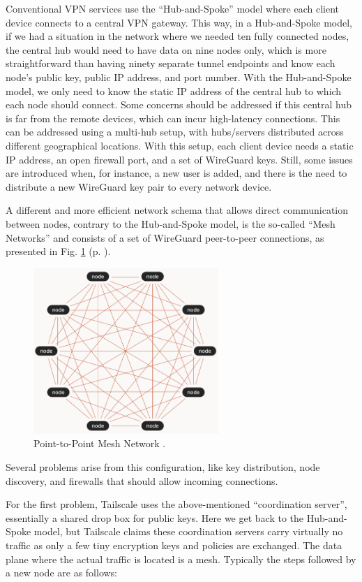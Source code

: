 Conventional VPN services use the ``Hub-and-Spoke'' model where each client device connects to a central VPN gateway. This way, in a Hub-and-Spoke model, if we had a situation in the network where we needed ten fully connected nodes, the central hub would need to have data on nine nodes only, which is more straightforward than having ninety separate tunnel endpoints and know each node's public key, public IP address, and port number. With the Hub-and-Spoke model, we only need to know the static IP address of the central hub to which each node should connect. Some concerns should be addressed if this central hub is far from the remote devices, which can incur high-latency connections. This can be addressed using a multi-hub setup, with hubs/servers distributed across different geographical locations. With this setup, each client device needs a static IP address, an open firewall port, and a set of WireGuard keys. Still, some issues are introduced when, for instance, a new user is added, and there is the need to distribute a new WireGuard key pair to every network device.

A different and more efficient network schema that allows direct communication between nodes, contrary to the Hub-and-Spoke model, is the so-called ``Mesh Networks'' and consists of a set of WireGuard peer-to-peer connections, as presented in Fig. \ref{fig:tailscale_mesh} (p. \pageref{fig:tailscale_mesh}).

\begin{figure}[H]
    \includegraphics[width=7cm]{figures/tailscale_meshnetwork.png}
    \caption{Point-to-Point Mesh Network \cite{tailscale_docs_ref}.}
    \label{fig:tailscale_mesh}
\end{figure}

Several problems arise from this configuration, like key distribution, node discovery, and firewalls that should allow incoming connections.

For the first problem, Tailscale uses the above-mentioned ``coordination server'', essentially a shared drop box for public keys. Here we get back to the Hub-and-Spoke model, but Tailscale claims these coordination servers carry virtually no traffic as only a few tiny encryption keys and policies are exchanged. The data plane where the actual traffic is located is a mesh. Typically the steps followed by a new node are as follows:

